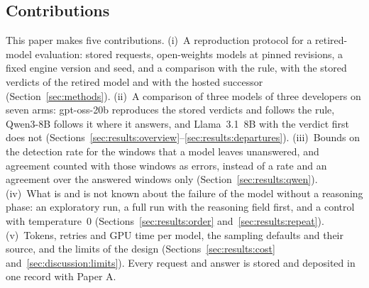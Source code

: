 \subsection{Contributions}
\label{sec:introduction:contributions}

This paper makes five contributions.
(i)~A reproduction protocol for a retired-model evaluation: stored requests, open-weights models at pinned revisions, a fixed engine version and seed, and a comparison with the rule, with the stored verdicts of the retired model and with the hosted successor (Section~\ref{sec:methods}).
(ii)~A comparison of three models of three developers on seven arms: gpt-oss-20b reproduces the stored verdicts and follows the rule, Qwen3-8B follows it where it answers, and Llama~3.1~8B with the verdict first does not (Sections~\ref{sec:results:overview}--\ref{sec:results:departures}).
(iii)~Bounds on the detection rate for the windows that a model leaves unanswered, and agreement counted with those windows as errors, instead of a rate and an agreement over the answered windows only (Section~\ref{sec:results:qwen}).
(iv)~What is and is not known about the failure of the model without a reasoning phase: an exploratory run, a full run with the reasoning field first, and a control with temperature~0 (Sections~\ref{sec:results:order} and~\ref{sec:results:repeat}).
(v)~Tokens, retries and GPU time per model, the sampling defaults and their source, and the limits of the design (Sections~\ref{sec:results:cost} and~\ref{sec:discussion:limits}). Every request and answer is stored and deposited in one record with Paper A.
